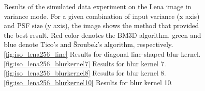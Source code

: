 \documentclass[12pt,notitlepage]{report}
\begin{document}
\begin{figure}[htb]
  \caption[Results for the lena image in variance mode]{Results of the simulated data experiment on the Lena image in variance mode. For a given combination of input variance (x axis) and PSF size (y axis), the image shows the method that provided the best result. Red color denotes the BM3D algorithm, green and blue denote Tico's and Šroubek's algorithm, respectively. \ref{fig:iso_lena256_line} Results for diagonal line-shaped blur kernel. \ref{fig:iso_lena256_blurkernel7} Results for blur kernel 7. \ref{fig:iso_lena256_blurkernel8} Results for blur kernel 8. \ref{fig:iso_lena256_blurkernel10} Results for blur kernel 10.}
  \label{fig:var_lena256}
\end{figure}

\clearpage
\end{document}
